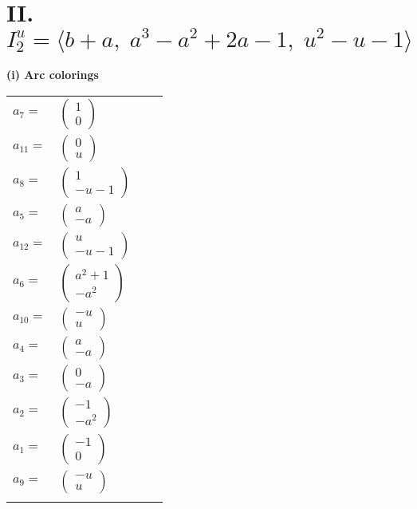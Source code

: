 \documentclass[1p]{elsarticle_modified}
\theoremstyle{definition}
\begin{document}
\centering \section*{II. $I^u_{2}= \langle b+a,\;a^3- a^2+2 a-1,\;u^2- u-1 \rangle$}
\flushleft \textbf{(i) Arc colorings}\\
\begin{tabular}{m{7pt} m{180pt} m{7pt} m{180pt} }
\flushright $a_{7}=$&$\begin{pmatrix}1\\0\end{pmatrix}$ \\
\flushright $a_{11}=$&$\begin{pmatrix}0\\u\end{pmatrix}$ \\
\flushright $a_{8}=$&$\begin{pmatrix}1\\- u-1\end{pmatrix}$ \\
\flushright $a_{5}=$&$\begin{pmatrix}a\\- a\end{pmatrix}$ \\
\flushright $a_{12}=$&$\begin{pmatrix}u\\- u-1\end{pmatrix}$ \\
\flushright $a_{6}=$&$\begin{pmatrix}a^2+1\\- a^2\end{pmatrix}$ \\
\flushright $a_{10}=$&$\begin{pmatrix}- u\\u\end{pmatrix}$ \\
\flushright $a_{4}=$&$\begin{pmatrix}a\\- a\end{pmatrix}$ \\
\flushright $a_{3}=$&$\begin{pmatrix}0\\- a\end{pmatrix}$ \\
\flushright $a_{2}=$&$\begin{pmatrix}-1\\- a^2\end{pmatrix}$ \\
\flushright $a_{1}=$&$\begin{pmatrix}-1\\0\end{pmatrix}$ \\
\flushright $a_{9}=$&$\begin{pmatrix}- u\\u\end{pmatrix}$\\&\end{tabular}
\end{document}
